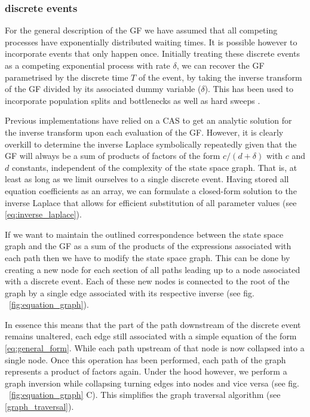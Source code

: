 \documentclass[10pt, a4]{article}
\begin{document}
\subsubsection{discrete events} \label{discrete_events}

For the general description of the GF we have assumed that all competing processes have exponentially distributed waiting times. It is possible however to incorporate events that only happen once. Initially treating these discrete events as a competing exponential process with rate $\delta$, we can recover the GF parametrised by the discrete time $T$ of the event, by taking the inverse transform of the GF divided by its associated dummy variable ($\delta$). This has been used to incorporate population splits and bottlenecks \citep{Lohse2011, Bunnefeld2015} as well as hard sweeps \citep{Bisschop2021}.

Previous implementations have relied on a CAS to get an analytic solution for the inverse transform upon each evaluation of the GF. However, it is clearly overkill to determine the inverse Laplace symbolically repeatedly given that the GF will always be a sum of products of factors of the form $c/(d+\delta)$ with $c$ and $d$ constants, independent of the complexity of the state space graph. That is, at least as long as we limit ourselves to a single discrete event. Having stored all equation coefficients as an array, we can formulate a closed-form solution to the inverse Laplace that allows for efficient substitution of all parameter values (see \ref{eq:inverse_laplace}). 

If we want to maintain the outlined correspondence between the state space graph and the GF as a sum of the products of the expressions associated with each path then we have to modify the state space graph. This can be done by creating a new node for each section of all paths leading up to a node associated with a discrete event. Each of these new nodes is connected to the root of the graph by a single edge associated with its respective inverse (see fig. \ \ref{fig:equation_graph}).

In essence this means that the part of the path downstream of the discrete event remains unaltered, each edge still associated with a simple equation of the form \ref{eq:general_form}. While each path upstream of that node is now collapsed into a single node. Once this operation has been performed, each path of the graph represents a product of factors again. Under the hood however, we perform a graph inversion while collapsing turning edges into nodes and vice versa (see fig. \ \ref{fig:equation_graph} C). This simplifies the graph traversal algorithm (see \ref{graph_traversal}). 
\end{document}
